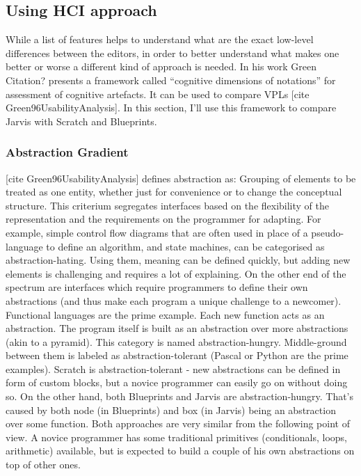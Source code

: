 \documentclass[11pt]{scrartcl}
\begin{document}
\subsection{Using HCI approach}
While a list of features helps to understand what are the exact low-level differences between the editors, in order to better understand what makes one better or worse a different kind of approach is needed. In his work Green {Citation?} presents a framework called “cognitive dimensions of notations” for assessment of cognitive artefacts. It can be used to compare VPLs [cite Green96UsabilityAnalysis]. In this section, I’ll use this framework to compare Jarvis with Scratch and Blueprints.
\subsubsection{Abstraction Gradient}
[cite Green96UsabilityAnalysis] defines abstraction as:
Grouping of elements to be treated as one entity, whether just for convenience or to change the conceptual structure.
This criterium segregates interfaces based on the flexibility of the representation and the requirements on the programmer for adapting. For example, simple control flow diagrams that are often used in place of a pseudo-language to define an algorithm, and state machines, can be categorised as abstraction-hating. Using them, meaning can be defined quickly, but adding new elements is challenging and requires a lot of explaining. On the other end of the spectrum are interfaces which require programmers to define their own abstractions (and thus make each program a unique challenge to a newcomer). Functional languages are the prime example. Each new function acts as an abstraction. The program itself is built as an abstraction over more abstractions (akin to a pyramid). This category is named abstraction-hungry. Middle-ground between them is labeled as abstraction-tolerant (Pascal or Python are the prime examples).
Scratch is abstraction-tolerant - new abstractions can be defined in form of custom blocks, but a novice programmer can easily go on without doing so. On the other hand, both Blueprints and Jarvis are abstraction-hungry. That’s caused by both node (in Blueprints) and box (in Jarvis) being an abstraction over some function. Both approaches are very similar from the following point of view. A novice programmer has some traditional primitives (conditionals, loops, arithmetic) available, but is expected to build a couple of his own abstractions on top of other ones.
\end{document}
